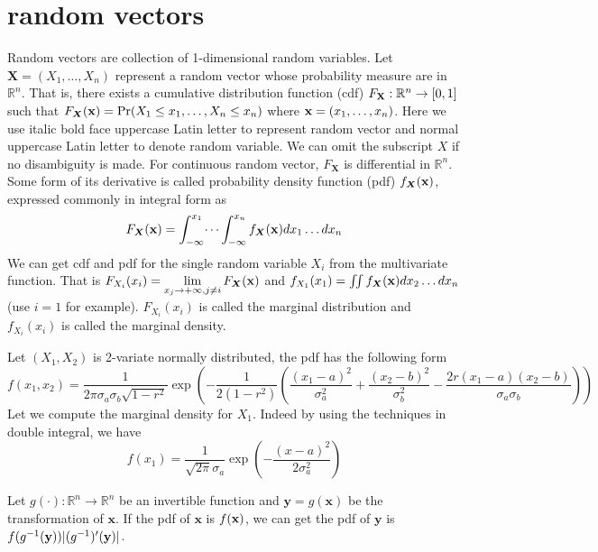 \section{random vectors}
Random vectors are collection of 1-dimensional random variables. Let $\bm{X} = (X_1, \dots, X_n)$ 
represent a random vector whose probability measure are in $\mathbb{R}^n$.
That is, there exists a cumulative distribution function (cdf) $F_{\mathbf{X}}: \mathbb{R}^n \rightarrow [0,1]$ 
such that $F_{\bm{X}}(\mathbf{x}) = \Pr(X_1 \leq x_1, \dots, X_n \leq x_n)$ where $ \mathbf{x} = (x_1, \dots, x_n)$.
Here we use italic bold face uppercase Latin letter to represent random vector and normal uppercase Latin letter to denote random variable. We can omit the subscript $X$ if no disambiguity is made. For continuous random vector, $F_{\bm{X}}$ is differential in $\mathbb{R}^n$. Some form of its derivative is called probability density function (pdf) $f_{\bm{X}}(\mathbf{x})$, expressed commonly in integral form as
\begin{equation}
F_{\bm{X}}(\mathbf{x}) = \int_{-\infty}^{x_1}\dots\int_{-\infty}^{x_n} f_{\bm{X}}(\mathbf{x}) dx_1 \dots dx_n
\end{equation}
We can get cdf and pdf for the single random variable $X_i$ from the multivariate function. That is
$ F_{X_i}(x_i) = \displaystyle\lim_{x_j \to +\infty, j\neq i} F_{\bm{X}}(\mathbf{x})$ and 
$ f_{X_1}(x_1) = \iint f_{\bm{X}}(\mathbf{x})dx_2 \dots d x_n$ (use $i=1$ for example).
$F_{X_i}(x_i)$ is called the marginal distribution and $f_{X_i}(x_i)$ is called the marginal density.

\begin{example}\label{ex:g2}
	Let $(X_1, X_2)$ is 2-variate normally distributed,  the pdf has the following form
\begin{equation}
f(x_1, x_2) = \frac{1}{2\pi \sigma_a \sigma_b \sqrt{1-r^2}} \exp(-\frac{1}{2(1-r^2)} \left(\frac{(x_1-a)^2}{\sigma_a^2} + \frac{(x_2-b)^2}{\sigma_b^2} -\frac{2r(x_1-a)(x_2-b)}{\sigma_a \sigma_b}\right)) 
\end{equation}
Let we compute the marginal density for $X_1$. Indeed by using the techniques in double integral, we have
\begin{equation}
f(x_1) = \frac{1}{\sqrt{2\pi}\sigma_a} \exp(-\frac{(x-a)^2}{2\sigma_a^2})
\end{equation}

\end{example}
Let $g(\cdot): \mathbb{R}^n \to \mathbb{R}^n$ be an invertible function and $\bm{y} = g(\bm{x})$ be the transformation of $\bm{x}$.
If the pdf of $\bm{x}$ is $f(\mathbf{x})$, we can get the pdf of $\bm{y}$ is $f(g^{-1}(\mathbf{y})) \lvert(g^{-1})'(\mathbf{y})\rvert$.
